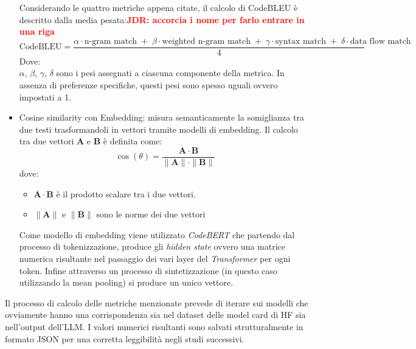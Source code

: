 \documentclass{article}
\newcommand{\JDR}[1]{\textbf{\textcolor{red}{JDR: {#1}}}}
\begin{document}
\begin{itemize}
\begin{itemize}
    \end{itemize}
    Considerando le quattro metriche appena citate, il calcolo di CodeBLEU è descritto dalla media pesata:\JDR{accorcia i nome per farlo entrare in una riga}
    \begin{equation} \label{codebleu}
        \text{CodeBLEU} = \frac{\alpha \cdot \text{n-gram match} \;+\; \beta \cdot \text{weighted n-gram match} \;+\; \gamma \cdot \text{syntax match} \;+\; \delta \cdot \text{data flow match}}{4}
    \end{equation}
    Dove:\\
    $\alpha$, $\beta$, $\gamma$, $\delta$ sono i pesi assegnati a ciascuna componente della metrica. In assenza di preferenze specifiche, questi pesi sono spesso uguali ovvero impostati a 1.  
    \item Cosine similarity con Embedding: misura semanticamente la somiglianza tra due testi trasformandoli in vettori tramite modelli di embedding. Il calcolo tra due vettori $\mathbf{A}$ e $\mathbf{B}$ è definita come:
    \begin{equation}
        \cos(\theta) = \frac{\mathbf{A} \cdot \mathbf{B}}{\|\mathbf{A}\| \cdot \|\mathbf{B}\|}
    \end{equation}
    dove:
    \begin{itemize}
        \item $\mathbf{A} \cdot \mathbf{B}$ è il prodotto scalare tra i due vettori.
        \item $\|\mathbf{A}\|$ e $\|\mathbf{B}\|$ sono le norme dei due vettori
    \end{itemize}
    Come modello di embedding viene utilizzato \textit{CodeBERT} \cite{feng2020codebertpretrainedmodelprogramming} che partendo dal processo di tokenizzazione, produce gli \textit{hidden state} ovvero una matrice numerica risultante nel passaggio dei vari layer del \textit{Transformer} per ogni token. Infine attraverso un processo di sintetizzazione (in questo caso utilizzando la mean pooling) si produce un unico vettore. 
\end{itemize}
Il processo di calcolo delle metriche menzionate prevede di iterare sui modelli che ovviamente hanno una corrispondenza sia nel dataset delle model card di HF sia nell'output dell'LLM. I valori numerici risultanti sono salvati strutturalmente in formato JSON per una corretta leggibilità negli studi successivi.
\end{document}
